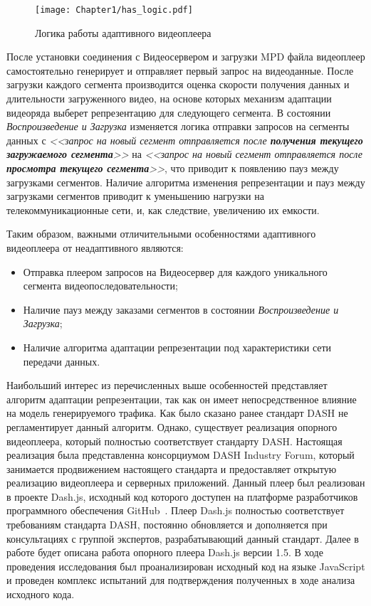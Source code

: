 \begin{figure}[htbp]
\begin{center}
\texttt{[image: Chapter1/has\_logic.pdf]}
\caption{Логика работы адаптивного видеоплеера}
\label{fig:has_logic}
\end{center}
\end{figure}

После установки соединения с Видеосервером и загрузки MPD файла видеоплеер самостоятельно генерирует и отправляет первый запрос на видеоданные. После загрузки каждого сегмента производится оценка скорости получения данных и длительности загруженного видео, на основе которых механизм адаптации видеоряда выберет репрезентацию для следующего сегмента. В состоянии \textit{Воспроизведение и Загрузка} изменяется логика отправки запросов на сегменты данных с \textit{<<запрос на новый сегмент отправляется после \textbf{получения текущего загружаемого сегмента}>>} на \textit{<<запрос на новый сегмент отправляется после \textbf{просмотра текущего сегмента}>>}, что приводит к появлению пауз между загрузками сегментов. Наличие алгоритма изменения репрезентации и пауз между загрузками сегментов приводит к уменьшению нагрузки на телекоммуникационные сети, и, как следствие, увеличению их емкости.

Таким образом, важными отличительными особенностями адаптивного видеоплеера от неадаптивного являются:
\begin{itemize}
  \item Отправка плеером запросов на Видеосервер для каждого уникального сегмента видеопоследовательности;
  \item Наличие пауз между заказами сегментов в состоянии \textit{Воспроизведение и Загрузка};
  \item Наличие алгоритма адаптации репрезентации под характеристики сети передачи данных.
\end{itemize}

Наибольший интерес из перечисленных выше особенностей представляет алгоритм адаптации репрезентации, так как он имеет непосредственное влияние на модель генерируемого трафика. Как было сказано ранее стандарт DASH не регламентирует данный алгоритм. Однако, существует реализация опорного видеоплеера, который полностью соответствует стандарту DASH. Настоящая реализация была представленна консорциумом DASH Industry Forum, который занимается продвижением настоящего стандарта и предоставляет открытую реализацию видеоплеера и серверных приложений. Данный плеер был реализован в проекте Dash.js, исходный код которого доступен на платформе разработчиков программного обеспечения GitHub~\cite{DashJS}. Плеер Dash.js полностью соответствует требованиям стандарта DASH, постоянно обновляется и дополняется при консультациях с группой экспертов, разрабатывающий данный стандарт. Далее в работе будет описана работа опорного плеера Dash.js версии 1.5. В ходе проведения исследования был проанализирован исходный код на языке JavaScript и проведен комплекс испытаний для подтверждения полученных в ходе анализа исходного кода.

